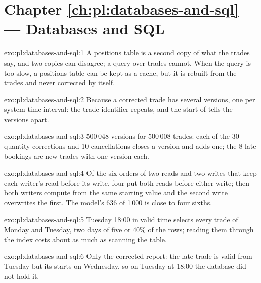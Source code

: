 \section*{Chapter \ref{ch:pl:databases-and-sql} --- Databases and SQL}

\begin{solution}{exo:pl:databases-and-sql:1}
A positions table is a second copy of what the trades say, and two copies can disagree; a query over trades cannot. When the query is too slow,
a positions table can be kept as a cache, but it is rebuilt from the trades and never corrected by itself.
\end{solution}

\begin{solution}{exo:pl:databases-and-sql:2}
Because a corrected trade has several versions, one per system-time interval: the trade identifier repeats, and the start of 
tells the versions apart.
\end{solution}

\begin{solution}{exo:pl:databases-and-sql:3}
500\,048 versions for 500\,008 trades: each of the 30 quantity corrections and 10 cancellations closes a version and adds one; the 8 late
bookings are new trades with one version each.
\end{solution}

\begin{solution}{exo:pl:databases-and-sql:4}
Of the six orders of two reads and two writes that keep each writer's read before its write, four put both reads before either write; then
both writers compute from the same starting value and the second write overwrites the first. The model's 636 of 1\,000 is close to four sixths.
\end{solution}

\begin{solution}{exo:pl:databases-and-sql:5}
Tuesday 18:00 in valid time selects every trade of Monday and Tuesday, two days of five or 40\% of the rows; reading them through the index
costs about as much as scanning the table.
\end{solution}

\begin{solution}{exo:pl:databases-and-sql:6}
Only the corrected report: the late trade is valid from Tuesday but its  starts on Wednesday, so on Tuesday at 18:00 the database
did not hold it.
\end{solution}

